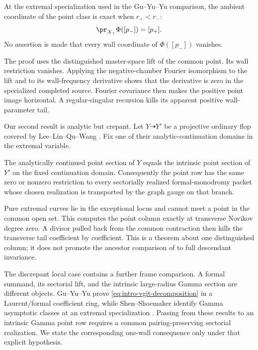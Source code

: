 \begin{theorem}
\label{thm:intro-simple-wall}
At the extremal specialization used in the Gu--Yu--Yu comparison, the
ambient coordinate of the point class is exact when \(r_+<r_-\):
\begin{equation}\label{eq:intro-common-open-point}
 \pr_{X_+}\Phi([p_-])=[p_+].
\end{equation}
No assertion is made that every wall coordinate of \(\Phi([p_-])\) vanishes.
\end{theorem}

The proof uses the distinguished master-space lift of the common point.  Its
wall restriction vanishes.  Applying the negative-chamber Fourier
isomorphism to the lift and to its wall-frequency derivative shows that the
derivative is zero in the specialized completed source.  Fourier covariance
then makes the positive point image horizontal.  A regular-singular
recursion kills its apparent positive wall-parameter tail.

Our second result is analytic but crepant.  Let \(Y\dashrightarrow Y'\) be a
projective ordinary flop covered by Lee--Lin--Qu--Wang
\cite{LeeLinQuWang}.  Fix one of their analytic-continuation domains in the
extremal variable.

\begin{theorem}
\label{thm:intro-flop}
The analytically continued point section of \(Y\) equals the intrinsic point
section of \(Y'\) on the fixed continuation domain.  Consequently the point
row has the same zero or nonzero restriction to every sectorially realized
formal-monodromy packet whose chosen realization is transported by the graph
gauge on that branch.
\end{theorem}

Pure extremal curves lie in the exceptional locus and cannot meet a point in
the common open set.  This computes the point column exactly at transverse
Novikov degree zero.  A divisor pulled back from the common contraction then
kills the transverse tail coefficient by coefficient.  This is a theorem
about one distinguished column; it does not promote the ancestor comparison
of \cite{LeeLinQuWang} to full descendant invariance.

The discrepant local case contains a further frame comparison.  A formal
summand, its sectorial lift, and the intrinsic large-radius Gamma section are
different objects.  Gu--Yu--Yu prove
\eqref{eq:intro-vgit-decomposition} in a Laurent/formal
coefficient ring, while Shen--Shoemaker identify Gamma asymptotic classes at
an extremal specialization \cite{ShenShoemaker}.  Passing from these results
to an intrinsic Gamma point row requires a common pairing-preserving
sectorial realization.  We state the corresponding one-wall consequence
only under that explicit hypothesis.

